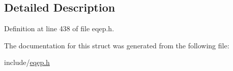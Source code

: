 \subsection{Detailed Description}


Definition at line 438 of file eqep.\+h.



The documentation for this struct was generated from the following file\+:\begin{DoxyCompactItemize}
\item 
include/\mbox{\hyperlink{eqep_8h}{eqep.\+h}}\end{DoxyCompactItemize}
